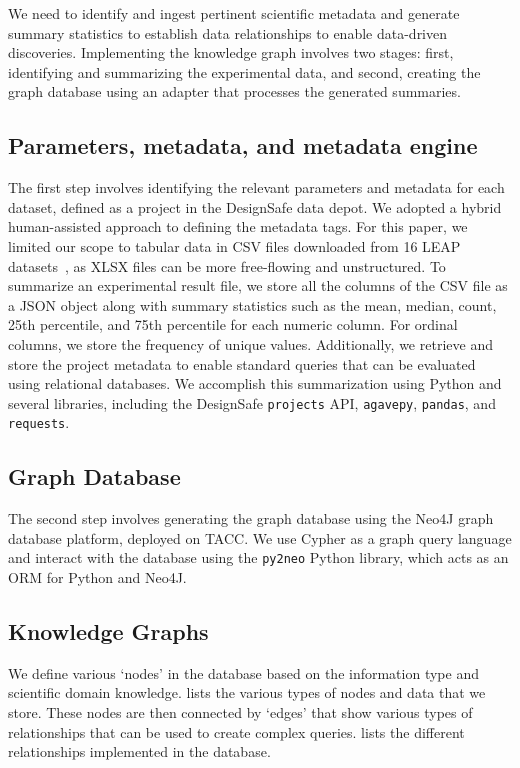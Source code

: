 \documentclass[acmsmall]{acmart}
\begin{document}
We need to identify and ingest pertinent scientific metadata and generate summary statistics to establish data relationships to enable data-driven discoveries. 
Implementing the knowledge graph involves two stages: first, identifying and summarizing the experimental data, and second, creating the graph database using an adapter that processes the generated summaries.

\subsection{Parameters, metadata, and metadata engine}
\label{sec:orgaf7a506}
The first step involves identifying the relevant parameters and metadata for each dataset, defined as a project in the DesignSafe data depot. 
We adopted a hybrid human-assisted approach to defining the metadata tags. 
For this paper, we limited our scope to tabular data in CSV files downloaded from 16 LEAP datasets~\cite{lbibb22_1, lbibb22_2, lbibb22_3, elghoraiby21_1, elghoraiby21_2, elghoraiby21_3, escoffier23, huang23, ma23, madabhushi23, manandhar23, mitsu23, stone23, takemura23, ueda23, zeghal23}, as XLSX files can be more free-flowing and unstructured.
To summarize an experimental result file, we store all the columns of the CSV file as a JSON object along with summary statistics such as the mean, median, count, 25th percentile, and 75th percentile for each numeric column. 
For ordinal columns, we store the frequency of unique values. 
Additionally, we retrieve and store the project metadata to enable standard queries that can be evaluated using relational databases. 
We accomplish this summarization using Python and several libraries, including the DesignSafe \texttt{projects} API, \texttt{agavepy}, \texttt{pandas}, and \texttt{requests}.

\subsection{Graph Database}
\label{sec:org7ee2b01}
The second step involves generating the graph database using the Neo4J graph database platform, deployed on TACC. 
We use Cypher as a graph query language and interact with the database using the \texttt{py2neo} Python library, which acts as an ORM for Python and Neo4J.

\subsection{Knowledge Graphs}
\label{sec:org31f4533}
We define various `nodes' in the database based on the information type and scientific domain knowledge. 
 lists the various types of nodes and data that we store.
These nodes are then connected by `edges' that show various types of relationships that can be used to create complex queries. 
 lists the different relationships implemented in the database.
\end{document}
